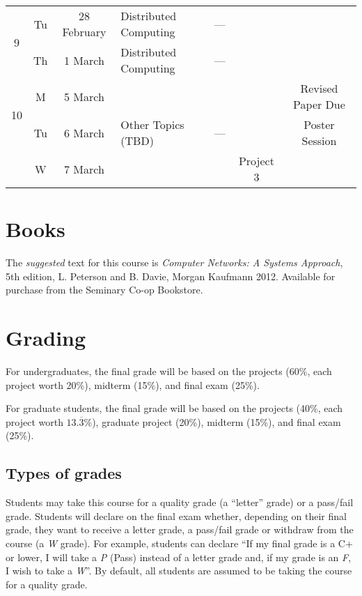 \documentclass[11pt]{article}
\begin{document}
\begin{sidewaystable}
\begin{tabular}{|c|cc||p{8cm}|c|c|c|}
\multirow{2}{*}{9}  & Tu & 28 February   & Distributed Computing      & --- & \cellcolor[gray]{0.9}  & \cellcolor[gray]{0.9} \\\cline{2-6}
                    & Th & 1 March   & Distributed Computing      & --- & \cellcolor[gray]{0.9}  & \cellcolor[gray]{0.9} \\\hline\hline

\multirow{2}{*}{10} & M & 5 March    & \cellcolor[gray]{0.9} & \cellcolor[gray]{0.9} &  \cellcolor[gray]{0.9} & Revised Paper Due \\\cline{2-7}
                    & Tu & 6 March   & Other Topics (TBD)                & ---  & \cellcolor[gray]{0.9}  & Poster Session \\\cline{2-7}
                    & W &  7 March  & \cellcolor[gray]{0.9} & \cellcolor[gray]{0.9} &  Project 3 & \cellcolor[gray]{0.9} \\\hline
\end{tabular}
\label{tab:calendar}
\end{sidewaystable}


\section{Books}

The \emph{suggested} text for this course is \emph{Computer Networks: A Systems Approach}, 5th edition, L. Peterson and B. Davie, Morgan Kaufmann 2012. Available for purchase from the Seminary Co-op Bookstore. 

  
\section{Grading}

For undergraduates, the final grade will be based on the projects (60\%, each project worth 20\%), midterm (15\%), and final exam (25\%).

For graduate students, the final grade will be based on the projects (40\%, each project worth $13.\overline{3}$\%), graduate project (20\%), midterm (15\%), and final exam (25\%).

\subsection{Types of grades}

Students may take this course for a quality grade (a ``letter'' grade) or a pass/fail grade. Students will declare on the final exam whether, depending on their final grade, they want to receive a letter grade, a pass/fail grade or withdraw from the course (a \emph{W} grade). For example, students can declare ``If my final grade is a C+ or lower, I will take a \emph{P} (Pass) instead of a letter grade and, if my grade is an \emph{F}, I wish to take a \emph{W}''. By default, all students are assumed to be taking the course for a quality grade.
\end{document}
